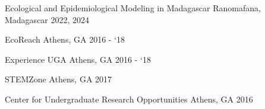 

\begin{cvhonors}

    \cvhonor
      {Ecological and Epidemiological Modeling in Madagascar}
      {}
      {Ranomafana, Madagascar}
      {2022, 2024}

    \cvhonor
      {EcoReach}
      {}
      {Athens, GA}
      {2016 - `18}

    \cvhonor
      {Experience UGA}
      {}
      {Athens, GA}
      {2016 - `18}

    \cvhonor
      {STEMZone}
      {}
      {Athens, GA}
      {2017}

    \cvhonor
      {Center for Undergraduate Research Opportunities} %
      {} %
      {Athens, GA} %
      {2016} %
\end{cvhonors}

